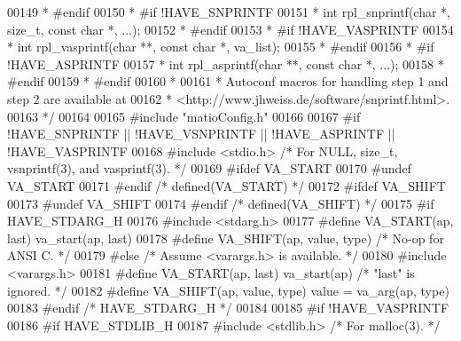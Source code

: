 \begin{DoxyCode}
{00149 \textcolor{comment}{ *      #endif}
00150 \textcolor{comment}{ *      #if !HAVE\_SNPRINTF}
00151 \textcolor{comment}{ *      int rpl\_snprintf(char *, size\_t, const char *, ...);}
00152 \textcolor{comment}{ *      #endif}
00153 \textcolor{comment}{ *      #if !HAVE\_VASPRINTF}
00154 \textcolor{comment}{ *      int rpl\_vasprintf(char **, const char *, va\_list);}
00155 \textcolor{comment}{ *      #endif}
00156 \textcolor{comment}{ *      #if !HAVE\_ASPRINTF}
00157 \textcolor{comment}{ *      int rpl\_asprintf(char **, const char *, ...);}
00158 \textcolor{comment}{ *      #endif}
00159 \textcolor{comment}{ *      #endif}
00160 \textcolor{comment}{ *}
00161 \textcolor{comment}{ * Autoconf macros for handling step 1 and step 2 are available at}
00162 \textcolor{comment}{ * <http://www.jhweiss.de/software/snprintf.html>.}
00163 \textcolor{comment}{ */}
00164 
00165 \textcolor{preprocessor}{#include "matioConfig.h"}
00166 
00167 \textcolor{preprocessor}{#if !HAVE\_SNPRINTF || !HAVE\_VSNPRINTF || !HAVE\_ASPRINTF || !HAVE\_VASPRINTF}
00168 \textcolor{preprocessor}{#include <stdio.h>}  \textcolor{comment}{/* For NULL, size\_t, vsnprintf(3), and vasprintf(3). */}
00169 \textcolor{preprocessor}{#ifdef VA\_START}
00170 \textcolor{preprocessor}{#undef VA\_START}
00171 \textcolor{preprocessor}{#endif  }\textcolor{comment}{/* defined(VA\_START) */}\textcolor{preprocessor}{}
00172 \textcolor{preprocessor}{#ifdef VA\_SHIFT}
00173 \textcolor{preprocessor}{#undef VA\_SHIFT}
00174 \textcolor{preprocessor}{#endif  }\textcolor{comment}{/* defined(VA\_SHIFT) */}\textcolor{preprocessor}{}
00175 \textcolor{preprocessor}{#if HAVE\_STDARG\_H}
00176 \textcolor{preprocessor}{#include <stdarg.h>}
00177 \textcolor{preprocessor}{#define VA\_START(ap, last) va\_start(ap, last)}
00178 \textcolor{preprocessor}{#define VA\_SHIFT(ap, value, type) }\textcolor{comment}{/* No-op for ANSI C. */}\textcolor{preprocessor}{}
00179 \textcolor{preprocessor}{#else   }\textcolor{comment}{/* Assume <varargs.h> is available. */}\textcolor{preprocessor}{}
00180 \textcolor{preprocessor}{#include <varargs.h>}
00181 \textcolor{preprocessor}{#define VA\_START(ap, last) va\_start(ap) }\textcolor{comment}{/* "last" is ignored. */}\textcolor{preprocessor}{}
00182 \textcolor{preprocessor}{#define VA\_SHIFT(ap, value, type) value = va\_arg(ap, type)}
00183 \textcolor{preprocessor}{#endif  }\textcolor{comment}{/* HAVE\_STDARG\_H */}\textcolor{preprocessor}{}
00184 
00185 \textcolor{preprocessor}{#if !HAVE\_VASPRINTF}
00186 \textcolor{preprocessor}{#if HAVE\_STDLIB\_H}
00187 \textcolor{preprocessor}{#include <stdlib.h>} \textcolor{comment}{/* For malloc(3). */}
}
\end{DoxyCode}
